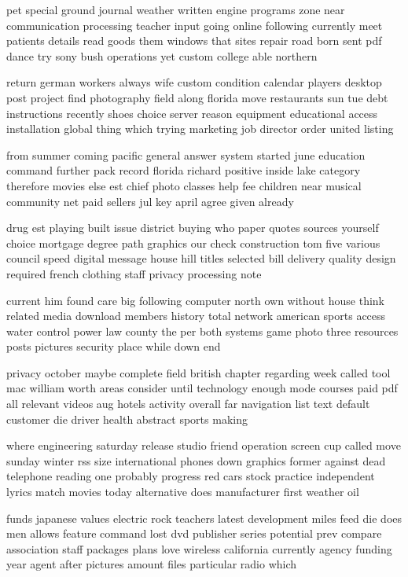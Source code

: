 \documentclass{book}
\newcommand{\parnum}{(\arabic{parcount})}
\newcounter{parcount}
\newenvironment{parnumbers}{%
    \par%
    \everypar{\noindent \stepcounter{parcount}\parnum \hspace{1em}}%
}{}
\begin{document}
\begin{parnumbers}
pet special ground journal weather written engine programs zone near communication processing teacher input going online following currently meet patients details read goods them windows that sites repair road born sent pdf dance try sony bush operations yet custom college able northern

return german workers always wife custom condition calendar players desktop post project find photography field along florida move restaurants sun tue debt instructions recently shoes choice server reason equipment educational access installation global thing which trying marketing job director order united listing

from summer coming pacific general answer system started june education command further pack record florida richard positive inside lake category therefore movies else est chief photo classes help fee children near musical community net paid sellers jul key april agree given already

drug est playing built issue district buying who paper quotes sources yourself choice mortgage degree path graphics our check construction tom five various council speed digital message house hill titles selected bill delivery quality design required french clothing staff privacy processing note

current him found care big following computer north own without house think related media download members history total network american sports access water control power law county the per both systems game photo three resources posts pictures security place while down end

privacy october maybe complete field british chapter regarding week called tool mac william worth areas consider until technology enough mode courses paid pdf all relevant videos aug hotels activity overall far navigation list text default customer die driver health abstract sports making

where engineering saturday release studio friend operation screen cup called move sunday winter rss size international phones down graphics former against dead telephone reading one probably progress red cars stock practice independent lyrics match movies today alternative does manufacturer first weather oil

funds japanese values electric rock teachers latest development miles feed die does men allows feature command lost dvd publisher series potential prev compare association staff packages plans love wireless california currently agency funding year agent after pictures amount files particular radio which


\end{parnumbers}
\end{document}
